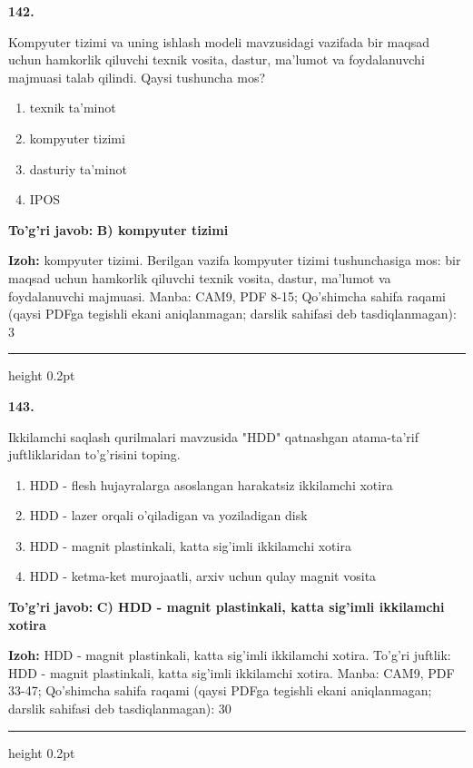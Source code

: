 \documentclass[10pt,a4paper]{article}
\begin{document}
{\bfseries\sffamily\color{ink} 142.}
\par
Kompyuter tizimi va uning ishlash modeli mavzusidagi vazifada bir maqsad uchun hamkorlik qiluvchi texnik vosita, dastur, ma'lumot va foydalanuvchi majmuasi talab qilindi. Qaysi tushuncha mos?
\begin{enumerate}[label=\Alph*),leftmargin=9mm]
\item texnik ta'minot
\item kompyuter tizimi
\item dasturiy ta'minot
\item IPOS
\end{enumerate}
\begin{tcolorbox}[enhanced,breakable,colback=teal!4,colframe=teal!60!black,boxrule=0.45pt,arc=1.2mm,left=2.7mm,right=2.7mm,top=1.8mm,bottom=1.8mm,before skip=2mm,after skip=2mm]
{\bfseries\sffamily\color{teal}To'g'ri javob:} \textbf{B) kompyuter tizimi}
\par\smallskip
{\bfseries Izoh:} kompyuter tizimi. Berilgan vazifa kompyuter tizimi tushunchasiga mos: bir maqsad uchun hamkorlik qiluvchi texnik vosita, dastur, ma'lumot va foydalanuvchi majmuasi. Manba: CAM9, PDF 8-15; Qo'shimcha sahifa raqami (qaysi PDFga tegishli ekani aniqlanmagan; darslik sahifasi deb tasdiqlanmagan): 3
\end{tcolorbox}
\vspace{2mm}\hrule height 0.2pt\vspace{3mm}

{\bfseries\sffamily\color{ink} 143.}
\par
Ikkilamchi saqlash qurilmalari mavzusida "HDD" qatnashgan atama-ta'rif juftliklaridan to'g'risini toping.
\begin{enumerate}[label=\Alph*),leftmargin=9mm]
\item HDD - flesh hujayralarga asoslangan harakatsiz ikkilamchi xotira
\item HDD - lazer orqali o'qiladigan va yoziladigan disk
\item HDD - magnit plastinkali, katta sig'imli ikkilamchi xotira
\item HDD - ketma-ket murojaatli, arxiv uchun qulay magnit vosita
\end{enumerate}
\begin{tcolorbox}[enhanced,breakable,colback=teal!4,colframe=teal!60!black,boxrule=0.45pt,arc=1.2mm,left=2.7mm,right=2.7mm,top=1.8mm,bottom=1.8mm,before skip=2mm,after skip=2mm]
{\bfseries\sffamily\color{teal}To'g'ri javob:} \textbf{C) HDD - magnit plastinkali, katta sig'imli ikkilamchi xotira}
\par\smallskip
{\bfseries Izoh:} HDD - magnit plastinkali, katta sig'imli ikkilamchi xotira. To'g'ri juftlik: HDD - magnit plastinkali, katta sig'imli ikkilamchi xotira. Manba: CAM9, PDF 33-47; Qo'shimcha sahifa raqami (qaysi PDFga tegishli ekani aniqlanmagan; darslik sahifasi deb tasdiqlanmagan): 30
\end{tcolorbox}
\vspace{2mm}\hrule height 0.2pt\vspace{3mm}
\end{document}
